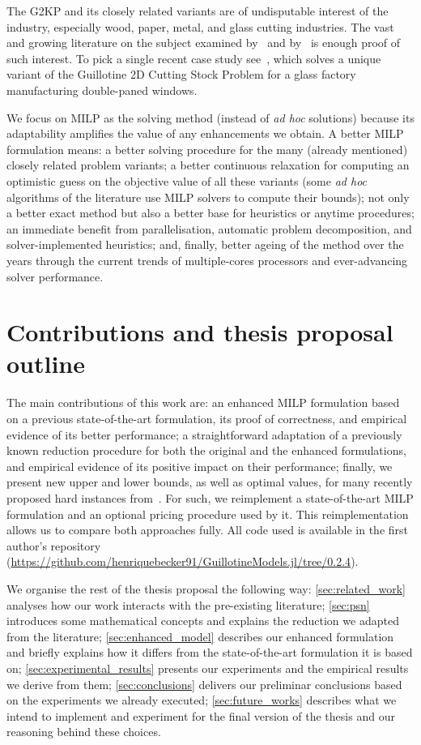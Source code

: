 \documentclass[ppgc,prop-tese,english,formais,babel]{iiufrgs}
\begin{document}
The G2KP and its closely related variants are of undisputable interest of the industry, especially wood, paper, metal, and glass cutting industries.
The vast and growing literature on the subject examined by~\citet{iori:2020} and by~\citet{russo:2020} is enough proof of such interest.
To pick a single recent case study see~\citet{clautiaux:2019}, which solves a unique variant of the Guillotine 2D Cutting Stock Problem for a glass factory manufacturing double-paned windows.

We focus on MILP as the solving method (instead of \emph{ad hoc} solutions) because its adaptability amplifies the value of any enhancements we obtain.
A better MILP formulation means:
a better solving procedure for the many (already mentioned) closely related problem variants;
a better continuous relaxation for computing an optimistic guess on the objective value of all these variants (some \emph{ad hoc} algorithms of the literature use MILP solvers to compute their bounds);
not only a better exact method but also a better base for heuristics or anytime procedures;
an immediate benefit from parallelisation, automatic problem decomposition, and solver-implemented heuristics;
and, finally, better ageing of the method over the years through the current trends of multiple-cores processors and ever-advancing solver performance.

\section{Contributions and thesis proposal outline}

The main contributions of this work are:
an enhanced MILP formulation based on a previous state-of-the-art formulation, its proof of correctness, and empirical evidence of its better performance;
a straightforward adaptation of a previously known reduction procedure for both the original and the enhanced formulations, and empirical evidence of its positive impact on their performance;
finally, we present new upper and lower bounds, as well as optimal values, for many recently proposed hard instances from~\citet{velasco:2019}.
For such, we reimplement a state-of-the-art MILP formulation and an optional pricing procedure used by it.
This reimplementation allows us to compare both approaches fully.
All code used is available in the first author's repository ({\small\url{https://github.com/henriquebecker91/GuillotineModels.jl/tree/0.2.4}}).

We organise the rest of the thesis proposal the following way:
\cref{sec:related_work} analyses how our work interacts with the pre-existing literature;
\cref{sec:psn} introduces some mathematical concepts and explains the reduction we adapted from the literature;
\cref{sec:enhanced_model} describes our enhanced formulation and briefly explains how it differs from the state-of-the-art formulation it is based on;
\cref{sec:experimental_results} presents our experiments and the empirical results we derive from them;
\cref{sec:conclusions} delivers our preliminar conclusions based on the experiments we already executed;
\cref{sec:future_works} describes what we intend to implement and experiment for the final version of the thesis and our reasoning behind these choices.
\end{document}
